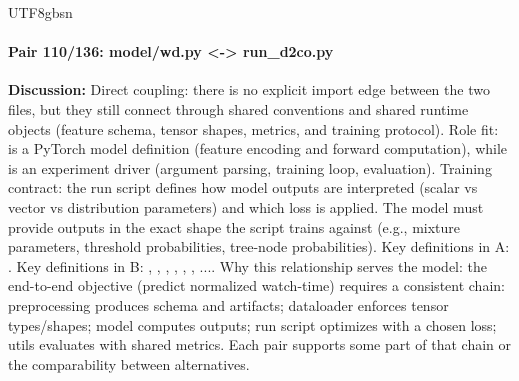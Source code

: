 \documentclass[11pt]{article}
\begin{document}
\begin{CJK*}{UTF8}{gbsn}
\paragraph{Pair 110/136: model/wd.py <-> run\_d2co.py}
\textbf{Discussion:} Direct coupling: there is no explicit import edge between the two files, but they still connect through shared conventions and shared runtime objects (feature schema, tensor shapes, metrics, and training protocol). Role fit: \texttt{} is a PyTorch model definition (feature encoding and forward computation), while \texttt{} is an experiment driver (argument parsing, training loop, evaluation). Training contract: the run script defines how model outputs are interpreted (scalar vs vector vs distribution parameters) and which loss is applied. The model must provide outputs in the exact shape the script trains against (e.g., mixture parameters, threshold probabilities, tree-node probabilities). Key definitions in A: \texttt{}. Key definitions in B: \texttt{}, \texttt{}, \texttt{}, \texttt{}, \texttt{}, \texttt{}, .... Why this relationship serves the model: the end-to-end objective (predict normalized watch-time) requires a consistent chain: preprocessing produces schema and artifacts; dataloader enforces tensor types/shapes; model computes outputs; run script optimizes with a chosen loss; utils evaluates with shared metrics. Each pair supports some part of that chain or the comparability between alternatives.


\end{CJK*}
\end{document}
